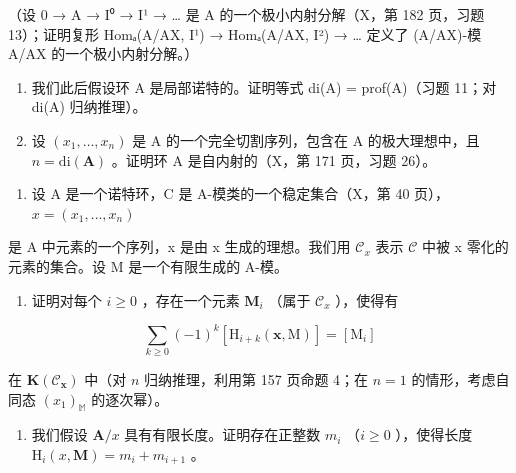 （设 0 → A → I⁰ → I¹ → \ldots{} 是 A 的一个极小内射分解（X，第 182 页，习题 13）；证明复形 Homₐ(A/AX, I¹) → Homₐ(A/AX, I²) → \ldots{} 定义了 (A/AX)-模 A/AX 的一个极小内射分解。）

\begin{enumerate}
\def\labelenumi{\alph{enumi})}
\setcounter{enumi}{1}
\item
  我们此后假设环 A 是局部诺特的。证明等式 di(A) = prof(A)（习题 11；对 di(A) 归纳推理）。
\item
  设 \((x_{1},\ldots ,x_{n})\) 是 A 的一个完全切割序列，包含在 A 的极大理想中，且 \(n = \mathrm{di}(\mathbf{A})\) 。证明环 A 是自内射的（X，第 171 页，习题 26）。
\end{enumerate}

\begin{enumerate}
\def\labelenumi{\arabic{enumi})}
\setcounter{enumi}{17}
\tightlist
\item
  设 A 是一个诺特环，C 是 A-模类的一个稳定集合（X，第 40 页）， \(x = (x_{1}, \ldots, x_{n})\)
\end{enumerate}

是 A 中元素的一个序列，x 是由 x 生成的理想。我们用 \(\mathcal{C}_{x}\) 表示 \(\mathcal{C}\) 中被 x 零化的元素的集合。设 M 是一个有限生成的 A-模。

\begin{enumerate}
\def\labelenumi{\alph{enumi})}
\tightlist
\item
  证明对每个 \(i \geqslant 0\) ，存在一个元素 \(\mathbf{M}_{i}\) （属于 \(\mathcal{C}_{x}\) ），使得有
\end{enumerate}

\[
\sum_ {k \geqslant 0} (- 1) ^ {k} \left[ \mathrm{H} _ {i + k} (\mathbf {x}, \mathrm{M}) \right] = [ \mathrm{M} _ {i} ]
\]

在 \(\mathbf{K}(\mathcal{C}_{\pmb{x}})\) 中（对 \(n\) 归纳推理，利用第 157 页命题 4；在 \(n = 1\) 的情形，考虑自同态 \((x_{1})_{\mathbb{M}}\) 的逐次幂）。

\begin{enumerate}
\def\labelenumi{\alph{enumi})}
\setcounter{enumi}{1}
\tightlist
\item
  我们假设 \(\mathbf{A} / x\) 具有有限长度。证明存在正整数 \(m_{i}\) （\(i \geqslant 0\) ），使得长度 \(\mathrm{H}_{i}(x, \mathbf{M}) = m_{i} + m_{i+1}\) 。
\end{enumerate}

